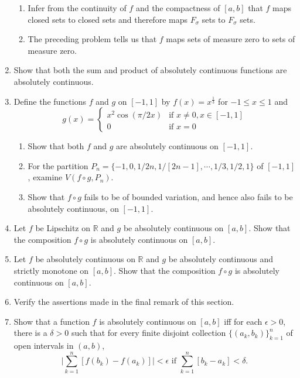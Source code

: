 \begin{enumerate}
    \begin{enumerate}[label=(\roman*),align=left]
        \item Infer from the continuity of $f$ and the compactness of $[a,b]$ that $f$ maps closed sets to closed sets and therefore maps $F_\sigma$ sets to $F_\sigma$ sets.
        \item The preceding problem tells us that $f$ maps sets of measure zero to sets of measure zero. 
    \end{enumerate}
    \item Show that both the sum and product of absolutely continuous functions are absolutely continuous.
    \item Define the functions $f$ and $g$ on $[-1,1]$ by $f(x)=x^{\frac{1}{3}}$ for $-1\le x\le 1$ and
    \[
        g(x)=
        \begin{cases}
            x^2\cos(\pi/2x)&\text{if }x\neq0,x\in[-1,1]\\
            0&\text{if }x=0
        \end{cases}  
    \]
    \begin{enumerate}[label=(\roman*),align=left]
        \item Show that both $f$ and $g$ are absolutely continuous on $[-1,1]$.
        \item For the partition $P_n=\{-1,0,1/2n,1/[2n-1],\cdots,1/3,1/2,1\}$ of $[-1,1]$, examine $V(f\circ g,P_n)$.
        \item Show that $f\circ g$ fails to be of bounded variation, and hence also fails to be absolutely continuous, on $[-1,1]$. 
    \end{enumerate}
    \item Let $f$ be Lipschitz on $\mathbb{R}$ and $g$ be absolutely continuous on $[a,b]$. Show that the composition $f \circ g$ is absolutely continuous on $[a,b]$.
    \item Let $f$ be absolutely continuous on $\mathbb{R}$ and $g$ be absolutely continuous and strictly monotone on $[a,b]$. Show that the composition $f\circ g$ is absolutely continuous on $[a,b]$.
    \item Verify the assertions made in the final remark of this section.
    \item Show that a function $f$ is absolutely continuous on $[a,b]$ iff for each $\epsilon>0$, there is a $\delta>0$ such that for every finite disjoint collection $\{(a_k,b_k)\}_{k=1}^n$ of open intervals in $(a,b)$,
    \[
        \biggl|\sum_{k=1}^n[f(b_k)-f(a_k)]\biggr|<\epsilon\text{ if }\sum_{k=1}^n[b_k-a_k]<\delta.  
    \]
\end{enumerate}

